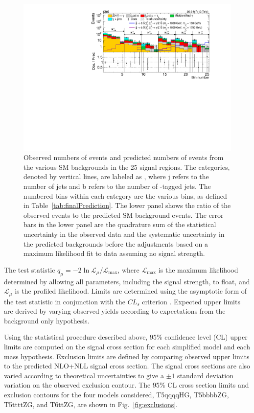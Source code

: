\begin{figure}[htb!]
\centering
\includegraphics[width=0.99\linewidth]{../Figures/Chap4/Figure_004.pdf}
\captionsetup{width=.95\linewidth}
\caption[Results: Prediction vs observation in 25 search bins]{Observed numbers of events and predicted numbers of events from the various SM backgrounds in the 25 signal regions.
The categories, denoted by vertical lines, are labeled as \njb,
where j refers to the number of jets and b refers to the number of {\cPqb}-tagged jets.
The numbered bins within each category are the various \ptmiss bins, as defined in Table~\ref{tab:finalPrediction}. The lower panel
shows the ratio of the observed events to the predicted SM background events.
The error bars in the lower panel are the quadrature sum of the statistical uncertainty in the observed data
and the systematic uncertainty in the predicted backgrounds before the adjustments based on
a maximum likelihood fit to data assuming no signal strength.}
\label{fig:summaryPlot}
\end{figure}

The test statistic $q_{\mu} = -2 \ln{\mathcal{L}_{\mu}/ \mathcal{L}_{\mathrm{max}}}$, 
where $\mathcal{L}_{\mathrm{max}}$ 
is the maximum likelihood determined by allowing all parameters, including the signal 
strength, to float, and $\mathcal{L}_{\mu}$
is the profiled likelihood. Limits are determined using the asymptotic form of the test 
statistic \cite{Cowan:2010js} 
in conjunction with the $CL_s$ criterion \cite{Junk1999,bib-cls}. Expected 
upper limits are derived by varying observed yields according to expectations from the 
background only hypothesis.
\begin{sloppypar} Using the statistical procedure described above, 95\% confidence level (CL) upper limits
are computed on the signal cross section for each simplified model and each mass hypothesis.
Exclusion limits are defined by comparing observed upper limits to the predicted
NLO+NLL signal cross section. The signal cross
sections are also varied according to theoretical uncertainties to give a ${\pm}1$ standard deviation variation
on the observed exclusion contour.  The 95\% CL cross section limits and exclusion contours for the four models considered, T5qqqqHG, T5bbbbZG,
T5ttttZG, and T6ttZG, are shown in Fig.~\ref{fig:exclusions}.
\end{sloppypar}

